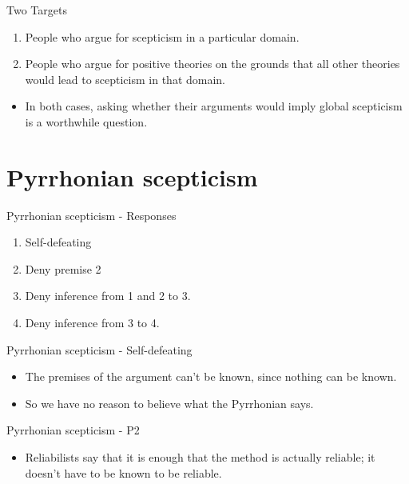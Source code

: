 \documentclass[
  17pt,
  letterpaper,
  ignorenonframetext,
  aspectratio=169,
  handout]{beamer}
\providecommand{\tightlist}{%
  \setlength{\itemsep}{0pt}\setlength{\parskip}{0pt}}\usepackage{longtable,booktabs,array}
\begin{document}
\begin{frame}{Two Targets}
\protect\hypertarget{two-targets}{}
\begin{enumerate}[<+->]
\tightlist
\item
  People who argue for scepticism in a particular domain.
\item
  People who argue for positive theories on the grounds that all other
  theories would lead to scepticism in that domain.
\end{enumerate}

\begin{itemize}[<+->]
\tightlist
\item
  In both cases, asking whether their arguments would imply global
  scepticism is a worthwhile question.
\end{itemize}
\end{frame}

\hypertarget{pyrrhonian-scepticism-1}{%
\section{Pyrrhonian scepticism}\label{pyrrhonian-scepticism-1}}

\begin{frame}{Pyrrhonian scepticism - Responses}
\protect\hypertarget{pyrrhonian-scepticism---responses}{}
\begin{enumerate}[<+->]
\tightlist
\item
  Self-defeating
\item
  Deny premise 2
\item
  Deny inference from 1 and 2 to 3.
\item
  Deny inference from 3 to 4.
\end{enumerate}
\end{frame}

\begin{frame}{Pyrrhonian scepticism - Self-defeating}
\protect\hypertarget{pyrrhonian-scepticism---self-defeating}{}
\begin{itemize}[<+->]
\tightlist
\item
  The premises of the argument can't be known, since nothing can be
  known.
\item
  So we have no reason to believe what the Pyrrhonian says.
\end{itemize}
\end{frame}

\begin{frame}{Pyrrhonian scepticism - P2}
\protect\hypertarget{pyrrhonian-scepticism---p2}{}
\begin{itemize}[<+->]
\tightlist
\item
  Reliabilists say that it is enough that the method is actually
  reliable; it doesn't have to be known to be reliable.
\end{itemize}
\end{frame}
\end{document}
